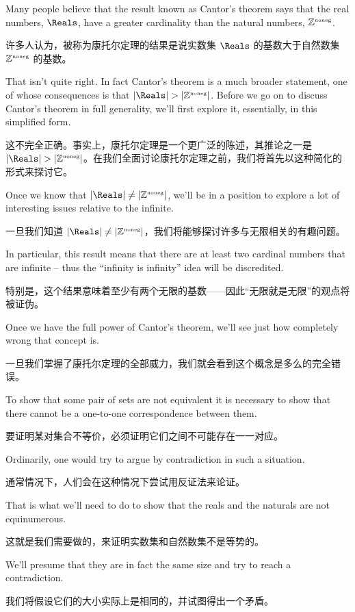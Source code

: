 Many people believe that the result known as Cantor's theorem says that
the real numbers, $\Reals$, have a greater cardinality than the natural numbers, ${\mathbb Z}^{\mbox{\tiny noneg}}$.

许多人认为，被称为康托尔定理的结果是说实数集 $\Reals$ 的基数大于自然数集 ${\mathbb Z}^{\mbox{\tiny noneg}}$ 的基数。

That isn't quite right.  In fact Cantor's theorem is a much broader statement,
one of whose consequences is that $|\Reals|
    > |\Naturals|$.  Before we go
on to discuss Cantor's theorem in full generality, we'll first explore it,
essentially, in this simplified form.

这不完全正确。事实上，康托尔定理是一个更广泛的陈述，其推论之一是 $|\Reals| > |\Naturals|$。在我们全面讨论康托尔定理之前，我们将首先以这种简化的形式来探讨它。

Once we know that $|\Reals| \neq |\Naturals|$, we'll be in a position to
explore a lot of
interesting issues relative to the infinite.

一旦我们知道 $|\Reals| \neq |\Naturals|$，我们将能够探讨许多与无限相关的有趣问题。

In particular, this result
means that there are at least two cardinal numbers that are
infinite -- thus the ``infinity is infinity'' idea will be discredited.

特别是，这个结果意味着至少有两个无限的基数——因此“无限就是无限”的观点将被证伪。

Once we have the full power of Cantor's
theorem, we'll see just how completely wrong that concept is.

一旦我们掌握了康托尔定理的全部威力，我们就会看到这个概念是多么的完全错误。

To show that some pair of sets are not equivalent it is necessary to show
that there cannot be a one-to-one correspondence between them.

要证明某对集合不等价，必须证明它们之间不可能存在一一对应。

Ordinarily,
one would try to argue by contradiction in such a situation.

通常情况下，人们会在这种情况下尝试用反证法来论证。

That is what
we'll need to do to show that the reals and the naturals are not equinumerous.

这就是我们需要做的，来证明实数集和自然数集不是等势的。

We'll presume that they are in fact the same size and try to reach a
contradiction.

我们将假设它们的大小实际上是相同的，并试图得出一个矛盾。

